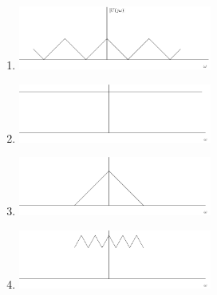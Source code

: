 \documentclass[journal,12pt,onecolumn]{IEEEtran}
\theoremstyle{remark}
\begin{document}
\begin{enumerate}
\begin{enumerate}
    \item	 \begin{center}

\includegraphics[width=0.5\textwidth]{figs/fig8/fig8.2/main} 
\end{center}
 
    \item 	 \begin{center}

\includegraphics[width=0.5\textwidth]{figs/fig8/fig8.3/main} 
\end{center}

    \item 	 \begin{center}

\includegraphics[width=0.5\textwidth]{figs/fig8/fig8.4/main} 

\end{center}

    \item 	 \begin{center}

\includegraphics[width=0.5\textwidth]{figs/fig8/fig8.5/main} 
\end{center}\\


\end{enumerate}
\end{enumerate}
\end{document}
